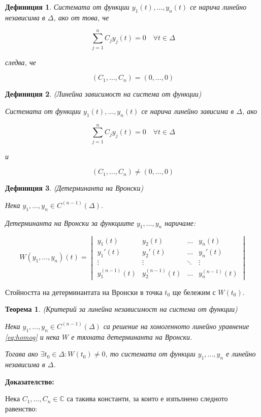 \documentclass{scrartcl}
\newtheorem{theorem}{Теорема}
\newtheorem{definition}{Дефиниция}
\begin{document}
\begin{FlushLeft}
\begin{definition}
Системата от функции $y_1(t), \dots, y_n(t)$ се нарича линейно независима в $\Delta$, ако от това, че

$$\sum_{j=1}^n C_jy_j(t) = 0 \quad \forall t \in \Delta$$

следва, че

$$(C_1, \dots, C_n) = (0, \dots, 0)$$
\end{definition}

\begin{definition}
(Линейна зависимост на система от функции)

Системата от функции $y_1(t), \dots, y_n(t)$ се нарича линейно зависима в $\Delta$, ако

$$\sum_{j=1}^n C_jy_j(t) = 0 \quad \forall t \in \Delta$$

и

$$(C_1, \dots, C_n) \ne (0, \dots, 0)$$
\end{definition}

\begin{definition}
(Детерминанта на Вронски)

Нека $y_1, \dots, y_n \in C^{(n-1)}(\Delta)$.

Детерминанта на Вронски за функциите $y_1, \dots, y_n$ наричаме:

$$
W(y_1, \dots, y_n)(t) = 
\begin{vmatrix}
y_1(t) & y_2(t) & \dots & y_n(t) \\
y_1'(t) & y_2'(t) & \dots & y_n'(t) \\
\vdots & \vdots & \ddots & \vdots \\
y_1^{(n-1)}(t) & y_2^{(n-1)}(t) & \dots & y_n^{(n-1)}(t)
\end{vmatrix}
$$
\end{definition}

Стойността на детерминантата на Вронски в точка $t_0$ ще бележим с $W(t_0)$.

\begin{theorem}
(Критерий за линейна независимост на система от функции)

Нека $y_1, \dots, y_n \in C^{(n-1)}(\Delta)$ са решение на хомогенното линейно уравнение \eqref{eq:homog} и нека $W$ е тяхната детерминанта на Вронски.

Тогава ако $\exists t_0 \in \Delta : W(t_0) \ne 0$, то системата от функции $y_1, \dots, y_n$ е линейно независима в $\Delta$.
\end{theorem}

\textbf{Доказателство:}

Нека $C_1, \dots, C_n \in \mathbb{C}$ са такива константи, за които е изпълнено следното равенство:


\end{FlushLeft}
\end{document}
